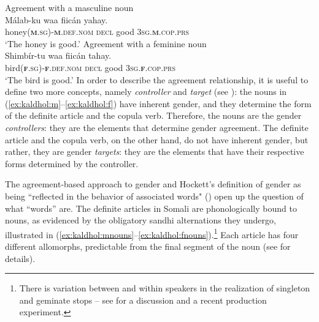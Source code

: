 \documentclass[output=paper]{langscibook}
\begin{document}
\ea\label{ex:kaldhol:m}
	Agreement with a masculine noun\\
		\gll Málab-ku waa fiicán yahay.\\
		honey(\textsc{\textbf{m}.sg})-\textsc{\textbf{m}.def.nom} \textsc{decl} good \textsc{3sg.\textbf{m}}.\textsc{cop.prs}\\
		\glt `The honey is good.'
\ex\label{ex:kaldhol:f}
	Agreement with a feminine noun\\
		\gll Shimbír-tu waa fiicán tahay.\\
		bird(\textsc{\textbf{f}.sg})-\textsc{\textbf{f}.def.nom} \textsc{decl} good \textsc{3sg.\textbf{f}}.\textsc{cop.prs}\\
		\glt `The bird is good.'
\z
In order to describe the agreement relationship, it is useful to define two more concepts, namely \textit{controller} and \textit{target} (see \citealt[4]{Corbett1991}): the nouns in (\ref{ex:kaldhol:m}--\ref{ex:kaldhol:f}) have inherent gender, and they determine the form of the definite article and the copula verb. Therefore, the nouns are the gender \textit{controllers}: they are the elements that determine gender agreement. The definite article and the copula verb, on the other hand, do not have inherent gender, but rather, they are gender \textit{targets}: they are the elements that have their respective forms determined by the controller. 

The agreement-based approach to gender and Hockett's definition of gender as being  ``reflected in the behavior of associated words" (\citeyear[231]{Hockett1958}) open up the question of what ``words'' are. The definite articles in Somali are phonologically bound to nouns, as evidenced by the obligatory sandhi alternations they undergo, illustrated in (\ref{ex:kaldhol:mnouns}--\ref{ex:kaldhol:fnouns}).\footnote{There is variation between and within speakers in the realization of singleton and geminate stops -- see \textcite{Bendjaballah2019} for a discussion and a recent production experiment.} 
Each article has four different allomorphs, predictable from the final segment of the noun (see \citealt[28]{Saeed1999a} for details).
\end{document}
